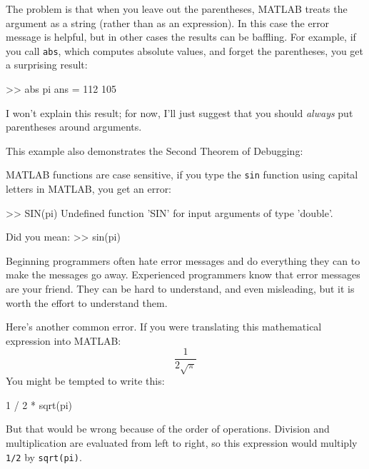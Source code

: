 \documentclass[main.tex]{subfiles}
\begin{document}
The problem is that when you leave out the parentheses, MATLAB treats
the argument as a string (rather than as an expression).
In this case the error message is helpful, but in other cases the results can be baffling.
For example, if you call {\tt abs}, which computes absolute values, and forget the parentheses, you get a surprising result:

\begin{code}
>> abs pi
ans =  112   105
\end{code}

I won't explain this result; for now, I'll just suggest that you should {\em always} put parentheses around arguments.


This example also demonstrates the Second Theorem of Debugging:

\begin{quote}
\end{quote}

MATLAB functions are case sensitive, if you type the {\tt sin} function using capital letters in MATLAB, you get an error:


\begin{code}
>> SIN(pi)
Undefined function 'SIN' for input arguments of type 'double'.

Did you mean:
>> sin(pi)
\end{code}

Beginning programmers often hate error messages and do everything they
can to make the messages go away.  Experienced programmers know that error
messages are your friend.  They can be hard to understand, and even
misleading, but it is worth the effort to understand them.


Here's another common error.
If you were translating this mathematical expression into MATLAB:
%
\[ \frac{1}{2 \sqrt \pi} \]
%
You might be tempted to write this:

\begin{code}
1 / 2 * sqrt(pi)
\end{code}

But that would be wrong because of the order of operations.  Division and multiplication are evaluated from left to right, so this expression would multiply {\tt 1/2} by {\tt sqrt(pi)}.

\end{document}
